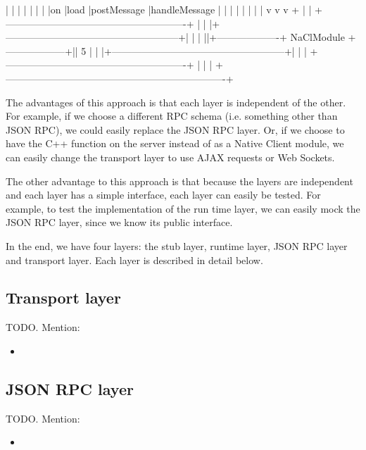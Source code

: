 \begin{code}
|         |        |       |                |                       |
|         |on      |load   |postMessage     |handleMessage          |
|         |        |       |                |                       |
|         v        v       v                +                       |
|     +-------------------------------------------------------+     |
|     |+-----------------------------------------------------+|     |
|     ||+-------------------+ NaClModule +------------------+|| 5   |
|     |+-----------------------------------------------------+|     |
|     +-------------------------------------------------------+     |
|                                                                   |
+-------------------------------------------------------------------+
\end{code}

The advantages of this approach is that each layer is independent of the other. For example, if we choose a different RPC schema (i.e. something other than JSON RPC), we could easily replace the JSON RPC layer. Or, if we choose to have the C++ function on the server instead of as a Native Client module, we can easily change the transport layer to use AJAX requests or Web Sockets. 


The other advantage to this approach is that because the layers are independent and each layer has a simple interface, each layer can easily be tested. For example, to test the implementation of the run time layer, we can easily mock the JSON RPC layer, since we know its public interface.

In the end, we have four layers: the stub layer, runtime layer, JSON RPC layer and transport layer. Each layer is described in detail below.

\subsection{Transport layer} %
\label{sub:transport_layer_design}
TODO. Mention:
\begin{itemize}
	\item 
\end{itemize}

\subsection{JSON RPC layer} %
\label{sub:json_rpc_layer_design}
TODO. Mention:
\begin{itemize}
	\item 
\end{itemize}

